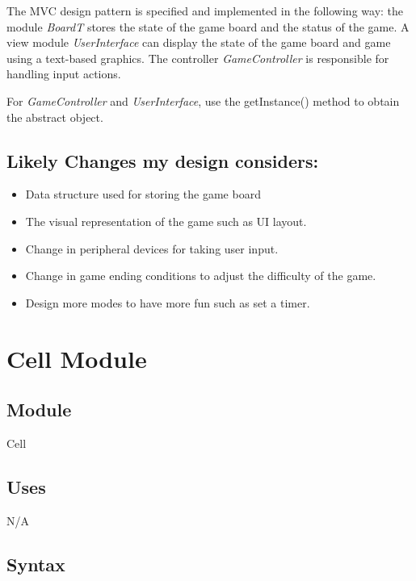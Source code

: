 \documentclass[12pt]{article}
\begin{document}
\medskip
The MVC design pattern is specified and implemented in the following way: the module \textit{BoardT}
stores the state of the game board and the status of the game. A view module \textit{UserInterface} can display
the state of the game board and game using a text-based graphics. The controller \textit{GameController}
is responsible for handling input actions. 

\medskip

For \textit{GameController} and \textit{UserInterface}, use the getInstance() method to obtain the abstract object.

\newpage

\subsection*{Likely Changes my design considers:}

\begin{itemize}
  \item Data structure used for storing the game board
  \item The visual representation of the game such as UI layout. 
  \item Change in peripheral devices for taking user input. 
  \item Change in game ending conditions to adjust the difficulty of the game.
  \item Design more modes to have more fun such as set a timer. 
\end{itemize}

\newpage

\section* {Cell Module}

\subsection*{Module}

Cell

\subsection* {Uses}

N/A

\subsection* {Syntax}
\end{document}
